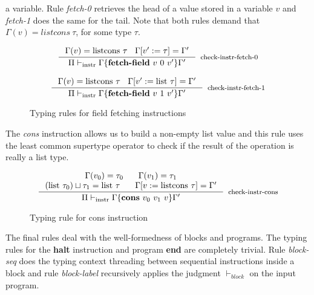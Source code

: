 \documentclass[review]{elsarticle}
\theoremstyle{definition}
\begin{document}
a variable. Rule \emph{fetch-0} retrieves the head of a value stored in a variable $v$ and \emph{fetch-1}
does the same for the tail. Note that both rules demand that $\Gamma(v) = listcons\:\tau$, for some type
$\tau$.
\begin{figure}[H]
\[
\begin{array}{c}
\inference{\Gamma(v) = \text{listcons}~\tau\:\:\:\:\Gamma[v':=\tau]=\Gamma'}
          {\Pi \vdash_{\text{instr}} \Gamma\{ \textbf{fetch-field}~v~0~v' \}\Gamma'}
          [check-instr-fetch-0]
          \\ \\
\inference{\Gamma(v) = \text{listcons}~\tau\:\:\:\:\Gamma[v':=\text{list}~\tau]=\Gamma'}
          {\Pi \vdash_{\text{instr}} \Gamma\{ \textbf{fetch-field}~v~1~v' \}\Gamma'}
          [check-instr-fetch-1]
\end{array}
\]
\centering
\caption{Typing rules for field fetching instructions}
\label{fig:typing-fetching}
\end{figure}
The \emph{cons} instruction allows us to build a non-empty list value and this rule uses the least
common supertype operator to check if the result of the operation is really a list type.
\begin{figure}[H]
\[
\inference{\Gamma(v_0) = \tau_0\:\:\:\:\:\:\:\:\Gamma(v_1) = \tau_1 \\
           (\text{list}~\tau_0) \sqcup \tau_1=\text{list}~\tau\:\:\:\:\:\:\:\:\Gamma[v:=\text{listcons}~\tau]=\Gamma'}
          {\Pi \vdash_{\text{instr}} \Gamma\{ \textbf{cons}~v_0~v_1~v \}\Gamma'}
          [check-instr-cons]
\]
\centering
\caption{Typing rule for cons instruction}
\label{fig:typing-fetching}
\end{figure}
The final rules deal with the well-formedness of blocks and programs. The typing rules for the \textbf{halt} instruction and
program \textbf{end} are completely trivial. Rule \emph{block-seq} does the typing context threading between sequential
instructions inside a block and rule \emph{block-label} recursively applies the judgment $\vdash_{block}$ on the
input program.
\end{document}
